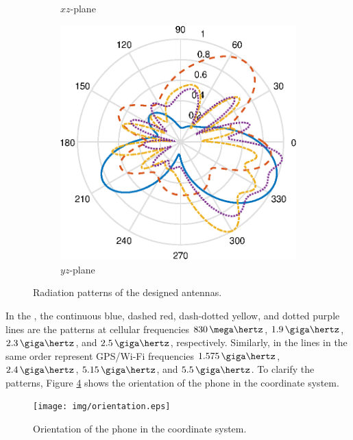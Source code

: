 \begin{figure}[H]
\begin{subfigure}[b]{0.3\textwidth}
        \caption{$xz$-plane}
        \label{fig:ff_xz_gpswifi}
    \end{subfigure}
    \begin{subfigure}[b]{0.3\textwidth}
        \includegraphics[width=\textwidth]{img/ff_gpswifi_yz.eps}
        \caption{$yz$-plane}
        \label{fig:ff_yz_gpswifi}
    \end{subfigure}
    \caption{Radiation patterns of the designed antennas.}
    \label{fig:rad_patterns}
\end{figure}

In the , the continuous blue, dashed red, dash-dotted yellow, and dotted purple lines are the patterns at cellular frequencies $830\,\mega\hertz$, $1.9\,\giga\hertz$, $2.3\,\giga\hertz$, and $2.5\,\giga\hertz$, respectively. Similarly, in  the lines in the same order represent GPS/Wi-Fi frequencies $1.575\,\giga\hertz$, $2.4\,\giga\hertz$, $5.15\,\giga\hertz$, and $5.5\,\giga\hertz$. To clarify the patterns, Figure \ref{fig:orientation} shows the orientation of the phone in the coordinate system.

\begin{figure}[H]
    \centering
    \texttt{[image: img/orientation.eps]}
    \caption{Orientation of the phone in the coordinate system.}
    \label{fig:orientation}
\end{figure}


